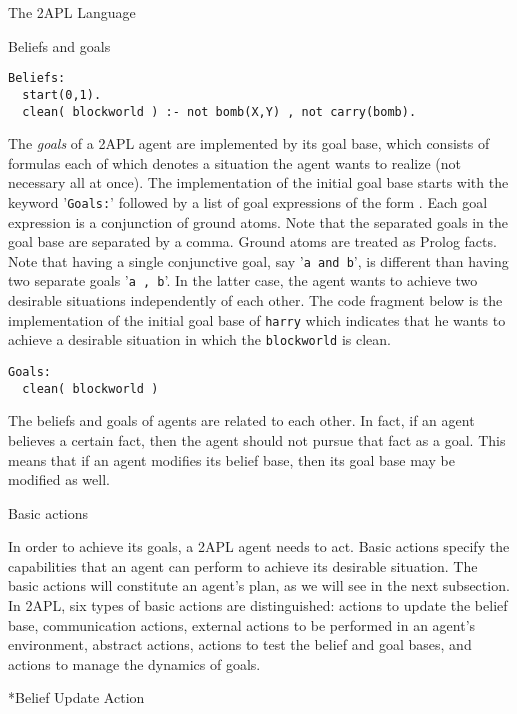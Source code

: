 \begin{chapter}{The 2APL Language}
\begin{section}{Beliefs and goals}
\begin{verbatim}
Beliefs:
  start(0,1).
  clean( blockworld ) :- not bomb(X,Y) , not carry(bomb).
\end{verbatim}

The \emph{goals} of a 2APL agent are implemented by its goal base,
which consists of formulas each of which denotes a situation the
agent wants to realize (not necessary all at once). The
implementation of the initial goal base starts with the keyword
'{\tt Goals:}' followed by a list of goal expressions of the form
. Each goal expression is a conjunction of ground atoms.
Note that the separated goals in the goal base are separated by a
comma. Ground atoms are treated as Prolog facts. Note that having a
single conjunctive goal, say '{\tt a and b}', is different than
having two separate goals '{\tt a , b}'. In the latter case, the
agent wants to achieve two desirable situations independently of
each other. The code fragment below is the implementation of the
initial goal base of {\tt harry} which indicates that he wants to
achieve a desirable situation in which the {\tt blockworld} is
clean.

\begin{verbatim}
Goals:
  clean( blockworld )
\end{verbatim}

The beliefs and goals of agents are related to each other. In fact,
if an agent believes a certain fact, then the agent should not
pursue that fact as a goal. This means that if an agent modifies its
belief base, then its goal base may be modified as well.
\end{section}


\begin{section}{Basic actions}

In order to achieve its goals, a 2APL agent needs to act. Basic
actions specify the capabilities that an agent can perform to
achieve its desirable situation. The basic actions will constitute
an agent's plan, as we will see in the next subsection. In 2APL, six
types of basic actions are distinguished: actions to update the
belief base, communication actions, external actions to be performed
in an agent's environment, abstract actions, actions to test the
belief and goal bases, and actions to manage the dynamics of goals.

\begin{subsection}*{Belief Update Action}


\end{subsection}
\end{section}
\end{chapter}
